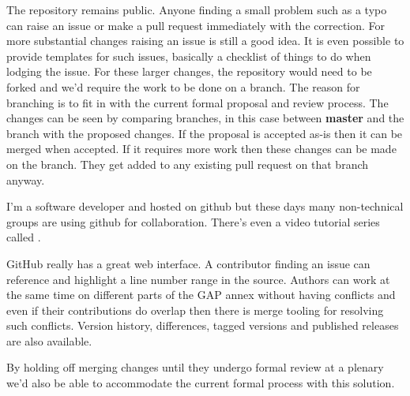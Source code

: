 \documentclass{article}
\begin{document}
The repository remains public. Anyone finding a small problem such as a typo
can raise an issue or make a pull request immediately with the correction. For
more substantial changes raising an issue is still a good idea. It is even
possible to provide templates for such issues, basically a checklist of things
to do when lodging the issue. For these larger changes, the repository would
need to be forked and we'd require the work to be done on a branch. The reason
for branching is to fit in with the current formal proposal and review process.
The changes can be seen by comparing branches, in this case between
\textbf{master} and the branch with the proposed changes. If the proposal is
accepted as-is then it can be merged when accepted. If it requires more work
then these changes can be made on the branch. They get added to any existing
pull request on that branch anyway.

I'm a software developer and  hosted on github but these days many non-technical groups are
using github for collaboration.  There's even a video tutorial series called
.

GitHub really has a great web interface. A contributor finding an issue can
reference and highlight a line number range in the source. Authors can work at
the same time on different parts of the GAP annex without having conflicts and
even if their contributions do overlap then there is merge tooling for
resolving such conflicts.  Version history, differences, tagged versions and
published releases are also available.

By holding off merging changes until they undergo formal review at a plenary
we'd also be able to accommodate the current formal process with this solution.
\end{document}
